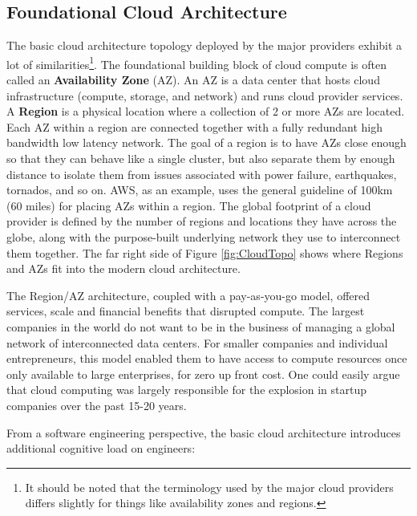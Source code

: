 \documentclass[conference]{IEEEconf}
\begin{document}
\subsection{Foundational Cloud Architecture}
The basic cloud architecture topology deployed by the major providers exhibit a lot of similarities\footnote{It should be noted that the terminology used by the major cloud providers differs slightly for things like availability zones and regions.}.  The foundational building block of cloud compute is often called an \textbf{Availability Zone} (AZ).  An AZ is a data center that hosts cloud infrastructure (compute, storage, and network) and runs cloud provider services.  A \textbf{Region} is a physical location where a collection of 2 or more AZs are located.  Each AZ within a region are connected together with a fully redundant high bandwidth low latency network.  The goal of a region is to have AZs close enough so that they can behave like a single cluster, but also separate them by enough distance to isolate them from issues associated with power failure, earthquakes, tornados, and so on.  AWS, as an example, uses the general guideline of 100km (60 miles)\cite{AWS-AZ} for placing AZs within a region. The global footprint of a cloud provider is defined by the number of regions and locations they have across the globe, along with the purpose-built underlying network they use to interconnect them together. The far right side of Figure \ref{fig:CloudTopo} shows where Regions and AZs fit into the modern cloud architecture.

The Region/AZ architecture, coupled with a pay-as-you-go model, offered services, scale and financial benefits that disrupted compute.  The largest companies in the world do not want to be in the business of managing a global network of interconnected data centers. For smaller companies and individual entrepreneurs, this model enabled them to have access to compute resources once only available to large enterprises, for zero up front cost.  One could easily argue that cloud computing was largely responsible for the explosion in startup companies over the past 15-20 years. 

From a software engineering perspective, the basic cloud architecture introduces additional cognitive load on engineers:
\end{document}
